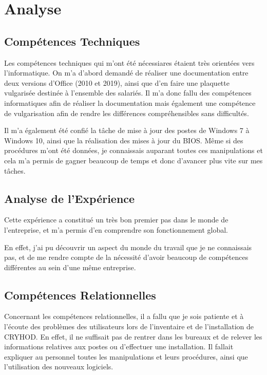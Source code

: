 \chapter{Analyse}


\section{Compétences Techniques}

Les compétences techniques qui m'ont été nécessiares étaient très orientées vers l'informatique.
On m'a d'abord demandé de réaliser une documentation entre deux versions d'Office (2010 et 2019), ainsi que d'en faire une plaquette vulgarisée destinée à l'ensemble des salariés.
Il m'a donc fallu des compétences informatiques afin de réaliser la documentation mais également une compétence de vulgarisation afin de rendre les différences compréhensibles sans difficultés.

Il m'a également été confié la tâche de mise à jour des postes de Windows 7 à Windows 10, ainsi que la réalisation des mises à jour du BIOS.
Même si des procédures m'ont été données, je connaissais auparant toutes ces manipulations et cela m'a permis de gagner beaucoup de temps et donc d'avancer plus vite sur mes tâches.

\section{Analyse de l'Expérience}

Cette expérience a constitué un très bon premier pas dans le monde de l'entreprise, et m'a permis d'en comprendre son fonctionnement global.

En effet, j'ai pu découvrir un aspect du monde du travail que je ne connaissais pas, et de me rendre compte de la nécessité d'avoir beaucoup de compétences différentes au sein d'une même entreprise.


\section{Compétences Relationnelles}

Concernant les compétences relationnelles, il a fallu que je sois patiente et à l'écoute des problèmes des utilisateurs lors de l'inventaire et de l'installation de CRYHOD. 
En effet, il ne suffisait pas de rentrer dans les bureaux et de relever les informations relatives aux postes ou d'effectuer une installation. Il fallait expliquer au personnel toutes les manipulations et leurs procédures, ainsi que l'utilisation des nouveaux logiciels.

